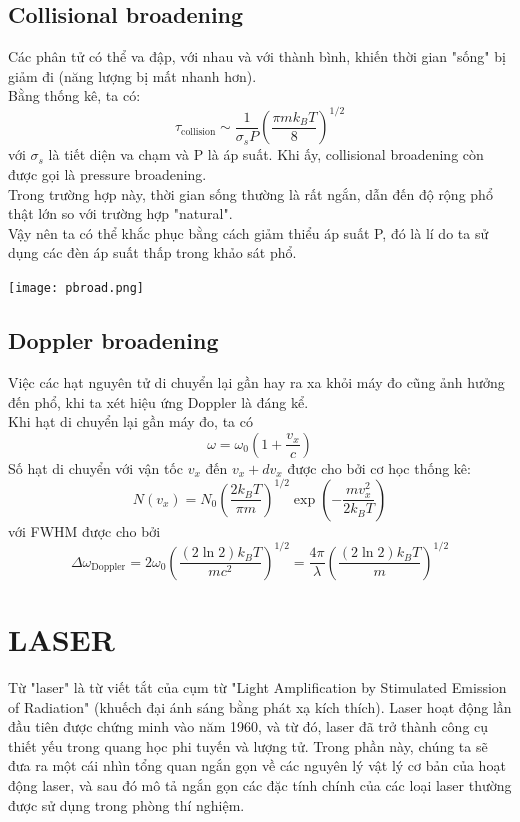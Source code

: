 \documentclass{article}
\begin{document}
\subsection*{Collisional broadening}
Các phân tử có thể va đập, với nhau và với thành bình, khiến thời gian "sống" bị giảm đi (năng lượng bị mất nhanh hơn).\\
Bằng thống kê, ta có: $$\tau_{\text{collision}} \sim \frac{1}{\sigma_s P} \left( \frac{\pi m k_B T}{8} \right)^{1/2}$$ với $\sigma_s$ là tiết diện va chạm và P là áp suất. Khi ấy, collisional broadening còn được gọi là pressure broadening.\\
Trong trường hợp này, thời gian sống thường là rất ngắn, dẫn đến độ rộng phổ thật lớn so với trường hợp "natural".\\
Vậy nên ta có thể khắc phục bằng cách giảm thiểu áp suất P, đó là lí do ta sử dụng các đèn áp suất thấp trong khảo sát phổ.\\
\begin{center}
	\texttt{[image: pbroad.png]}\\
\end{center}
\subsection*{Doppler broadening}
Việc các hạt nguyên tử di chuyển lại gần hay ra xa khỏi máy đo cũng ảnh hưởng đến phổ, khi ta xét hiệu ứng Doppler là đáng kể. \\
Khi hạt di chuyển lại gần máy đo, ta có $$\omega=\omega_0\left(1+\frac{v_x}{c}\right)$$
Số hạt di chuyển với vận tốc $v_x$ đến $v_x+dv_x$ được cho bởi cơ học thống kê: $$N(v_x) = N_0 \left( \frac{2k_B T}{\pi m} \right)^{1/2} \exp \left( -\frac{m v_x^2}{2k_B T} \right)$$ với FWHM được cho bởi $$\Delta \omega_{\text{Doppler}} = 2 \omega_0 \left( \frac{(2 \ln 2) k_B T}{mc^2} \right)^{1/2} = \frac{4 \pi}{\lambda} \left( \frac{(2 \ln 2) k_B T}{m} \right)^{1/2}$$
\section*{LASER}
Từ "laser" là từ viết tắt của cụm từ "Light Amplification by Stimulated Emission of Radiation" (khuếch đại ánh sáng bằng phát xạ kích thích). Laser hoạt động lần đầu tiên được chứng minh vào năm 1960, và từ đó, laser đã trở thành công cụ thiết yếu trong quang học phi tuyến và lượng tử. Trong phần này, chúng ta sẽ đưa ra một cái nhìn tổng quan ngắn gọn về các nguyên lý vật lý cơ bản của hoạt động laser, và sau đó mô tả ngắn gọn các đặc tính chính của các loại laser thường được sử dụng trong phòng thí nghiệm.
\end{document}

